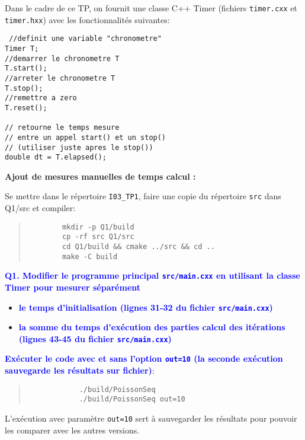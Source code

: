 \documentclass{beamer}
\begin{document}
\begin{frame}[fragile]
Dans le cadre de ce TP, on fournit une classe C++ Timer (fichiers {\tt timer.cxx} et {\tt timer.hxx}) avec les fonctionnalités suivantes:

\begin{lstlisting}
 //definit une variable "chronometre"
Timer T; 
//demarrer le chronometre T
T.start();
//arreter le chronometre T
T.stop();
//remettre a zero
T.reset();

// retourne le temps mesure 
// entre un appel start() et un stop()
// (utiliser juste apres le stop())
double dt = T.elapsed(); 
\end{lstlisting}

\end{frame}

\begin{frame}[fragile]
	
	\vfill
	
	{\bf Ajout de mesures manuelles de temps calcul :}
    \vfill

	Se mettre dans le r\'epertoire {\tt I03\_TP1}, faire une copie du r\'epertoire {\tt src} dans {Q1/src} et compiler:
	\begin{quote}
		\begin{verbatim}
		mkdir -p Q1/build
		cp -rf src Q1/src
		cd Q1/build && cmake ../src && cd ..
		make -C build
		\end{verbatim}
	\end{quote}

	\vfill

\end{frame}

\begin{frame}[fragile]
	\textcolor{blue}{\bf Q1. Modifier le programme principal {\tt src/main.cxx} en utilisant la classe Timer pour mesurer s\'epar\'ement}
	\begin{itemize}
	\item \textcolor{blue}{\bf le temps d'initialisation (lignes 31-32 du fichier {\tt src/main.cxx})}
	\item \textcolor{blue}{\bf la somme du temps d'ex\'ecution des parties calcul des it\'erations (lignes 43-45 du fichier {\tt src/main.cxx})}
	\end{itemize}

	\vfill
	\textcolor{blue}{\bf Ex\'ecuter le code avec et sans l'option {\tt out=10} (la seconde ex\'ecution sauvegarde les r\'esultats sur fichier)}:
	\begin{quote}
		\color{blue}
		\begin{verbatim}
			./build/PoissonSeq
			./build/PoissonSeq out=10
		\end{verbatim}
	\end{quote}

	L'ex\'ecution avec param\`etre {\tt out=10} sert \`a sauvegarder les r\'esultats pour pouvoir les comparer avec les autres versions.
	
\vfill
\end{frame}
\end{document}
